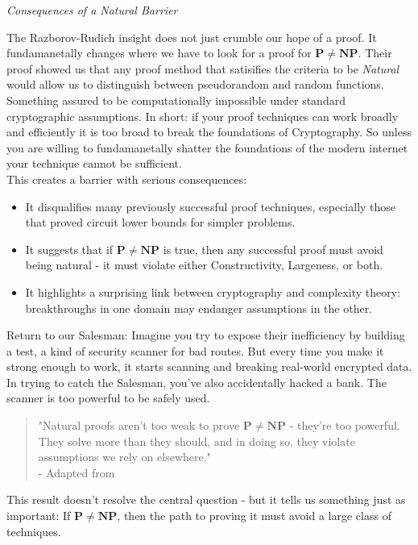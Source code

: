 \documentclass[12pt]{report}
\begin{document}
\begin{center}
    \vspace{0cm}
    {\Large\itshape Consequences of a Natural Barrier\par}
\end{center}
The Razborov-Rudich insight does not just crumble our hope of a proof.
It fundamanetally changes where we have to look for a proof for $\mathbf{P \ne NP}$.
Their proof showed us that any proof method that satisifies the criteria to be \textit{Natural} would allow us to distinguish between pseudorandom and random functions.
Something assured to be computationally impossible under standard cryptographic assumptions.
In short: if your proof techniques can work broadly and efficiently it is too broad to break the foundations of Cryptography.
So unless you are willing to fundamanetally shatter the foundations of the modern internet your technique cannot be sufficient.\\
This creates a barrier with serious consequences:
\begin{itemize}
    \item It disqualifies many previously successful proof techniques, especially those that proved circuit lower bounds for simpler problems.
    \item It suggests that if $\mathbf{P \ne NP}$ is true, then any successful proof must avoid being natural - it must violate either Constructivity, Largeness, or both.
    \item It highlights a surprising link between cryptography and complexity theory: breakthroughs in one domain may endanger assumptions in the other.
\end{itemize}
Return to our Salesman:
Imagine you try to expose their inefficiency by building a test, a kind of security scanner for bad routes.
But every time you make it strong enough to work, it starts scanning and breaking real-world encrypted data.
In trying to catch the Salesman, you've also accidentally hacked a bank.
The scanner is too powerful to be safely used.

\begin{quote}
    "Natural proofs aren't too weak to prove $\mathbf{P \ne NP}$ - they're too powerful.
    They solve more than they should, and in doing so, they violate assumptions we rely on elsewhere."\\
    - Adapted from \cite{razborov1994}
\end{quote}

This result doesn't resolve the central question - but it tells us something just as important:
If $\mathbf{P \ne NP}$, then the path to proving it must avoid a large class of techniques.
\vspace{3cm}
\end{document}
